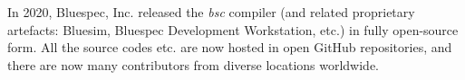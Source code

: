 \documentclass[twoside,letterpaper]{article}
\newcommand{\bsc}{\emph{bsc}}
\begin{document}
In 2020, Bluespec, Inc. released the {\bsc} compiler (and related
proprietary artefacts: Bluesim, Bluespec Development Workstation,
etc.) in fully open-source form.  All the source codes etc. are now
hosted in open GitHub repositories, and there are now many
contributors from diverse locations worldwide.



% 


\clearpage
{}
{}
\printindex
\end{document}
